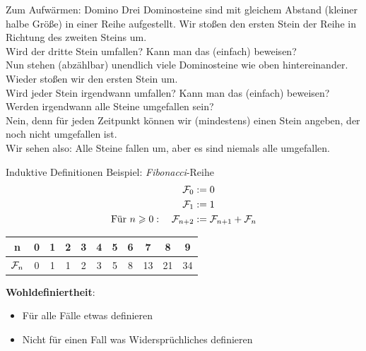 \begin{frame}{Zum Aufwärmen: Domino}
	Drei Dominosteine sind mit gleichem Abstand (kleiner halbe Größe) in einer Reihe aufgestellt. Wir stoßen den ersten Stein der Reihe in Richtung des zweiten Steins um. \\
	Wird der dritte Stein umfallen? Kann man das (einfach) beweisen? \\[1em]
	\pause
	Nun stehen (abzählbar) unendlich viele Dominosteine wie oben hintereinander. Wieder stoßen wir den ersten Stein um. \\
	Wird jeder Stein irgendwann umfallen? Kann man das (einfach) beweisen? \\[1em]
	\pause
	Werden irgendwann alle Steine umgefallen sein? \\
	\pause Nein, denn für jeden Zeitpunkt können wir (mindestens) einen Stein angeben, der noch nicht umgefallen ist.\\
	Wir sehen also: Alle Steine fallen um, aber es sind niemals alle umgefallen.
\end{frame}

\newcommand{\Fib}{\mathcal{F}\hspace{-1pt}}

\begin{frame}{Induktive Definitionen}
	Beispiel: \emph{Fibonacci}-Reihe 
	\begin{align*}
	\Fib_{0} &:= 0 \\
	\Fib_1 &:= 1 \\
	\text{Für } n \geq 0: \quad \Fib_{n+2} &:= \Fib_{n+1} + \Fib_n 		
	\end{align*}
	\pause
	\begin{table}
	\centering
	\begin{tabular}{|c|c|c|c|c|c|c|c|c|c|c|}
		\hline
		n & 0 & 1 & 2 & 3 & 4 & 5 & 6 & 7 & 8 & 9 \\ \hline
		$\Fib_n$ & 0 & 1 & 1 & 2 & 3 & 5 & 8 & 13 & 21 & 34 \\ \hline
	\end{tabular}
	\end{table}
	
	\pause
	\textbf{Wohldefiniertheit}: 
	\begin{itemize}
	\item Für alle Fälle etwas definieren 
	\item Nicht für einen Fall was Widersprüchliches definieren
	\end{itemize}
\end{frame}

